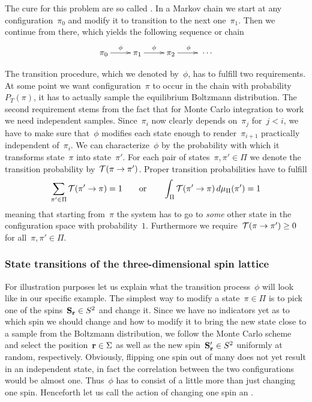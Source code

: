 The cure for this problem are so called . In a Markov
chain we start at any configuration~$\pi_0$ and modify it to transition to the
next one~$\pi_1$. Then we continue from there, which yields the following
sequence or chain
%
\begin{equation}
  \xymatrix{\pi_0 \ar[r]^{\phi} &\pi_1 \ar[r]^{\phi} &\pi_2 \ar[r]^{\phi}
  &\;\cdots}
\end{equation}

The transition procedure, which we denoted by~$\phi$, has to fulfill two
requirements. At some point we want configuration~$\pi$ to occur in the chain
with probability~$P_T(\pi)$, \ie{} it has to actually sample the equilibrium
Boltzmann distribution. The second requirement stems from the fact that for
Monte Carlo integration to work we need independent samples. Since~$\pi_{i}$ now
clearly depends on~$\pi_j$ for~$j < i$, we have to make sure that~$\phi$
modifies each state enough to render~$\pi_{i+1}$ practically independent
of~$\pi_i$. We can characterize~$\phi$ by the probability with which it
transforms state~$\pi$ into state~$\pi'$. For each pair of states~$\pi, \pi' \in
\Pi$ we denote the transition probability by~$\mathcal{T}(\pi \to \pi')$. Proper
transition probabilities have to fulfill
%
\begin{equation}\label{probprop}
  \sum_{\pi' \in \Pi} \mathcal{T}(\pi' \to \pi) = 1 \qquad\text{or}\qquad
  \int_{\Pi} \mathcal{T}(\pi' \to \pi) \,d\mu_{\Pi}(\pi') = 1
\end{equation}
%
meaning that starting from~$\pi$ the system has to go to \emph{some} other state
in the configuration space with probability~$1$. Furthermore we require~$\mathcal{T}(\pi
\to \pi') \ge 0$ for all~$\pi, \pi' \in \Pi$.

\subsubsection{State transitions of the three-dimensional spin lattice}

For illustration purposes let us explain what the transition process~$\phi$ will
look like in our specific example. The simplest way to modify a state~$\pi \in
\Pi$ is to pick one of the spins~$\mathbf{S}_{\mathbf{r}} \in S^2$ and change it. Since we have
no indicators yet as to which spin we should change and how to modify it to
bring the new state close to a sample from the Boltzmann distribution, we follow
the Monte Carlo scheme and select the position~$\mathbf{r} \in \Sigma$ as well as the
new spin~$\mathbf{S}'_{\mathbf{r}}\in S^2$ uniformly at random, respectively. Obviously, flipping
one spin out of many does not yet result in an independent state, in fact the
correlation between the two configurations would be almost one. Thus~$\phi$ has
to consist of a little more than just changing one spin. Henceforth let us call
the action of changing one spin an .


